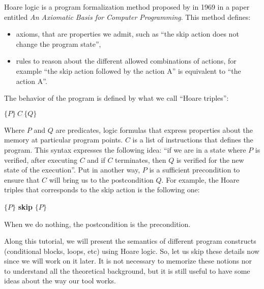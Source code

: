 

Hoare logic is a program formalization method proposed by
in 1969 in a paper entitled \emph{An Axiomatic Basis for Computer
Programming}. This method defines:



\begin{itemize}
\item   axioms, that are properties we admit, such as ``the skip action does
  not change the program state'',
\item   rules to reason about the different allowed combinations of actions,
  for example ``the skip action followed by the action A'' is equivalent
  to ``the action A''.
\end{itemize}


The behavior of the program is defined by what we call ``Hoare
triples'':




\begin{center}
$\{P\}\ C\ \{Q\}$
\end{center}


Where $P$ and $Q$ are predicates, logic formulas that express
properties about the memory at particular program points. $C$ is a
list of instructions that defines the program. This syntax expresses the
following idea: ``if we are in a state where $P$ is verified, after
executing $C$ and if $C$ terminates, then $Q$ is verified for the
new state of the execution''. Put in another way, $P$ is a sufficient
precondition to ensure that $C$ will bring us to the postcondition
$Q$. For example, the Hoare triples that corresponds to the skip
action is the following one:




\begin{center}
$\{P\}$ \textbf{skip} $\{P\}$
\end{center}


When we do nothing, the postcondition is the precondition.



Along this tutorial, we will present the semantics of different program
constructs (conditional blocks, loops, etc) using Hoare logic. So,
let us skip these details now since we will work on it later. It is
not necessary to memorize these notions nor to understand all the
theoretical background, but it is still useful to have some ideas about
the way our tool works.



